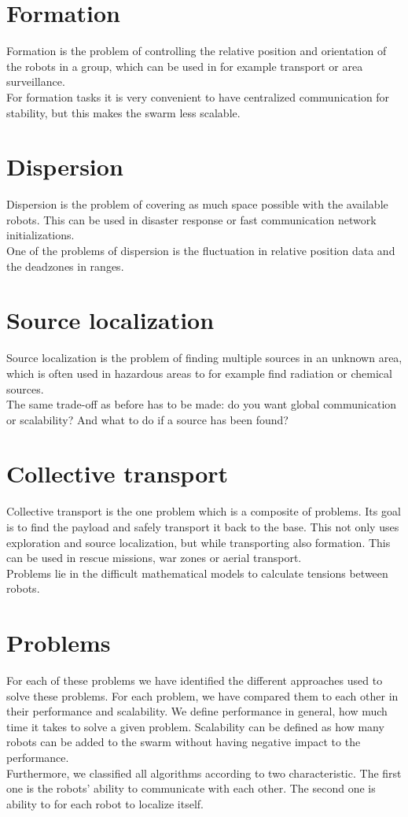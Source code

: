 \documentclass[a4paper]{article}
\begin{document}
\section*{Formation}
Formation is the problem of controlling the relative position and orientation of the robots in a group, which can be used in for example transport or area surveillance. \\
For formation tasks it is very convenient to have centralized communication for stability, but this makes the swarm less scalable.

\section*{Dispersion}
Dispersion is the problem of covering as much space possible with the available robots. This can be used in disaster response or fast communication network initializations. \\
One of the problems of dispersion is the fluctuation in relative position data and the deadzones in ranges.

\section*{Source localization}
Source localization is the problem of finding multiple sources in an unknown area, which is often used in hazardous areas to for example find radiation or chemical sources. \\
The same trade-off as before has to be made: do you want global communication or scalability? And what to do if a source has been found?

\section*{Collective transport}
Collective transport is the one problem which is a composite of problems. Its goal is to find the payload and safely transport it back to the base. This not only uses exploration and source localization, but while transporting also formation. This can be used in rescue missions, war zones or aerial transport.\\
Problems lie in the difficult mathematical models to calculate tensions between robots.

\section*{Problems}
For each of these problems we have identified the different approaches used to solve these problems. 
For each problem, we have compared them to each other in their performance and scalability.
We define performance in general, how much time it takes to solve a given problem.
Scalability can be defined as how many robots can be added to the swarm without having negative impact to the performance. \\
Furthermore, we classified all algorithms according to two characteristic.
The first one is the robots' ability to communicate with each other.
The second one is ability to for each robot to localize itself.\\
\end{document}
